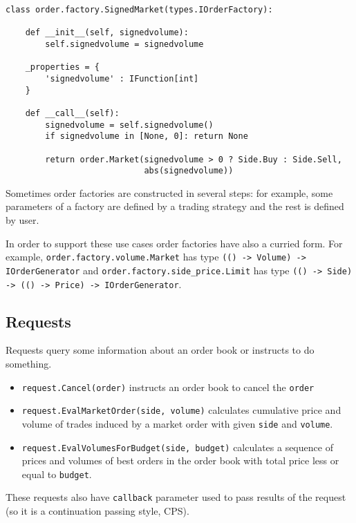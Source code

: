 \documentclass[a4paper,11pt]{article}
\begin{document}
\begin{verbatim}
class order.factory.SignedMarket(types.IOrderFactory):

    def __init__(self, signedvolume):
        self.signedvolume = signedvolume

    _properties = {
        'signedvolume' : IFunction[int]
    }

    def __call__(self):
        signedvolume = self.signedvolume()
        if signedvolume in [None, 0]: return None

        return order.Market(signedvolume > 0 ? Side.Buy : Side.Sell,
                            abs(signedvolume))
\end{verbatim}

Sometimes order factories are constructed in several steps: for example,
some parameters of a factory are defined by a trading strategy and the
rest is defined by user.

In order to support these use cases order factories have also a curried
form. For example, \texttt{order.factory.volume.Market} has type
\texttt{(() -\textgreater{} Volume) -\textgreater{} IOrderGenerator} and
\texttt{order.factory.side\_price.Limit} has type
\texttt{(() -\textgreater{} Side) -\textgreater{} (() -\textgreater{} Price) -\textgreater{} IOrderGenerator}.

\subsection{Requests}\label{requests}

Requests query some information about an order book or instructs to do
something.

\begin{itemize}
\itemsep1pt\parskip0pt
\item
  \texttt{request.Cancel(order)} instructs an order book to cancel the
  \texttt{order}
\item
  \texttt{request.EvalMarketOrder(side, volume)} calculates cumulative
  price and volume of trades induced by a market order with given
  \texttt{side} and \texttt{volume}.
\item
  \texttt{request.EvalVolumesForBudget(side, budget)} calculates a
  sequence of prices and volumes of best orders in the order book with
  total price less or equal to \texttt{budget}.
\end{itemize}

These requests also have \texttt{callback} parameter used to pass
results of the request (so it is a continuation passing style, CPS).
\end{document}
